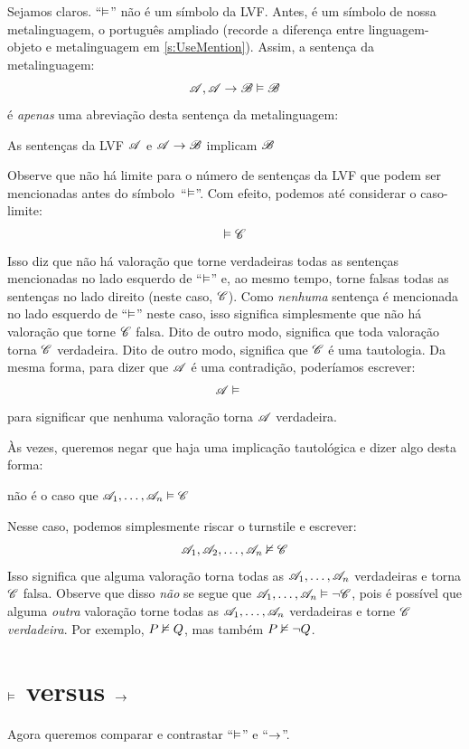 Sejamos claros. \textquotedblleft{}$\vDash$\textquotedblright{} não é um símbolo da LVF. Antes, é um símbolo de nossa metalinguagem, o português ampliado (recorde a diferença entre linguagem-objeto e metalinguagem em \cref{s:UseMention}). Assim, a sentença da metalinguagem:
	\[\mathscr{A}, \mathscr{A} \rightarrow \mathscr{B} \vDash \mathscr{B}\]
é \emph{apenas} uma abreviação desta sentença da metalinguagem:
	\begin{center}
		As sentenças da LVF $\mathscr{A}$ e $\mathscr{A} \rightarrow \mathscr{B}$ implicam $\mathscr{B}$
	\end{center}
Observe que não há limite para o número de sentenças da LVF que podem ser mencionadas antes do símbolo~\textquotedblleft{}$\vDash$\textquotedblright{}. Com efeito, podemos até considerar o caso-limite:
	$$\vDash \mathscr{C}$$
Isso diz que não há valoração que torne verdadeiras todas as sentenças mencionadas no lado esquerdo de \textquotedblleft{}$\vDash$\textquotedblright{} e, ao mesmo tempo, torne falsas todas as sentenças no lado direito (neste caso, $\mathscr{C}$). Como \emph{nenhuma} sentença é mencionada no lado esquerdo de \textquotedblleft{}$\vDash$\textquotedblright{} neste caso, isso significa simplesmente que não há valoração que torne $\mathscr{C}$ falsa. Dito de outro modo, significa que toda valoração torna $\mathscr{C}$ verdadeira. Dito de outro modo, significa que $\mathscr{C}$ é uma tautologia. Da mesma forma, para dizer que $\mathscr{A}$ é uma contradição, poderíamos escrever:
	$$\metav{A} \entails\phantom{\metav{C}}$$
para significar que nenhuma valoração torna $\mathscr{A}$ verdadeira.

Às vezes, queremos negar que haja uma implicação tautológica e dizer algo desta forma:
\begin{center}
	não é o caso que $\mathscr{A}_1, \ldots, \mathscr{A}_n \vDash \mathscr{C}$
\end{center}
Nesse caso, podemos simplesmente riscar o turnstile e escrever:
$$\mathscr{A}_1, \mathscr{A}_2, \ldots, \mathscr{A}_n \nvDash\mathscr{C}$$
Isso significa que alguma valoração torna todas as $\mathscr{A}_1, \ldots, \mathscr{A}_n$ verdadeiras e torna $\mathscr{C}$ falsa. Observe que disso \emph{não} se segue que $\mathscr{A}_1,\ldots, \mathscr{A}_n \vDash \neg \mathscr{C}$, pois é possível que alguma \emph{outra} valoração torne todas as $\mathscr{A}_1, \ldots, \mathscr{A}_n$ verdadeiras e torne $\mathscr{C}$ \emph{verdadeira}. Por exemplo, $P \nvDash Q$, mas também $P \nvDash \neg Q$.

\section{$\vDash$ versus $\rightarrow$}\label{entails-v-iff}
Agora queremos comparar e contrastar \textquotedblleft{}$\vDash$\textquotedblright{} e \textquotedblleft{}$\rightarrow$\textquotedblright{}.

